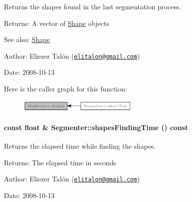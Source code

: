 Returns the shapes found in the last segmentation process. 

\begin{Desc}
\item[Returns:]A vector of \hyperlink{class_shape}{Shape} objects\end{Desc}
\begin{Desc}
\item[See also:]\hyperlink{class_shape}{Shape}\end{Desc}
\begin{Desc}
\item[Author:]Eliezer Talón (\href{mailto:elitalon@gmail.com}{\tt elitalon@gmail.com}) \end{Desc}
\begin{Desc}
\item[Date:]2008-10-13 \end{Desc}


Here is the caller graph for this function:\nopagebreak
\begin{figure}[H]
\begin{center}
\leavevmode
\includegraphics[width=166pt]{class_segmenter_7ddded12f26e94e6f5cba2752d2c4142_icgraph}
\end{center}
\end{figure}
\hypertarget{class_segmenter_8d7304b35b1891b1c7154a3ac2ff2c4b}{
\paragraph[{shapesFindingTime}]{\setlength{\rightskip}{0pt plus 5cm}const float \& Segmenter::shapesFindingTime () const}\hfill}
\label{class_segmenter_8d7304b35b1891b1c7154a3ac2ff2c4b}


Returns the elapsed time while finding the shapes. 

\begin{Desc}
\item[Returns:]The elapsed time in seconds\end{Desc}
\begin{Desc}
\item[Author:]Eliezer Talón (\href{mailto:elitalon@gmail.com}{\tt elitalon@gmail.com}) \end{Desc}
\begin{Desc}
\item[Date:]2008-10-13 \end{Desc}



